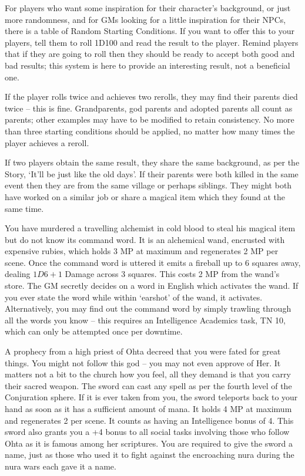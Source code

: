 \begin{multicols}{2}

For players who want some inspiration for their character's background, or just more randomness, and for GMs looking for a little inspiration for their NPCs, there is a table of Random Starting Conditions.  If you want to offer this to your players, tell them to roll 1D100 and read the result to the player.  Remind players that if they are going to roll then they should be ready to accept both good and bad results; this system is here to provide an interesting result, not a beneficial one.

If the player rolls twice and achieves two rerolls, they may find their parents died twice -- this is fine.  Grandparents, god parents and adopted parents all count as parents; other examples may have to be modified to retain consistency.  No more than three starting conditions should be applied, no matter how many times the player achieves a reroll.

	If two players obtain the same result, they share the same background, as per the Story, `It'll be just like the old days'.  If their parents were both killed in the same event then they are from the same village or perhaps siblings.  They might both have worked on a similar job or share a magical item which they found at the same time.

\setcounter{list}{0}
\begin{list}{\addtocounter{list}{1}\textbf{:}}{\raggedleft}

	\item{ You have murdered a travelling alchemist in cold blood to steal his magical item but do not know its command word.  It is an alchemical wand, encrusted with expensive rubies, which holds 3 MP at maximum and regenerates 2 MP per scene.  Once the command word is uttered it emits a fireball up to 6 squares away, dealing $1D6+1$ Damage across 3 squares.   This costs 2 MP from the wand's store.  The GM secretly decides on a word in English which activates the wand.  If you ever state the word while within `earshot' of the wand, it activates.  Alternatively, you may find out the command word by simply trawling through all the words you know -- this requires an Intelligence  Academics task, TN 10, which can only be attempted once per downtime. }

	\item{ A prophecy from a high priest of Ohta decreed that you were fated for great things.  You might not follow this god -- you may not even approve of Her.  It matters not a bit to the church how you feel, all they demand is that you carry their sacred weapon.  The sword can cast any spell as per the fourth level of the Conjuration sphere.  If it is ever taken from you, the sword teleports back to your hand as soon as it has a sufficient amount of mana.  It holds 4 MP at maximum and regenerates 2 per scene.  It counts as having an Intelligence bonus of 4.  This sword also grants you a +4 bonus to all social tasks involving those who follow Ohta as it is famous among her scriptures.  You are required to give the sword a name, just as those who used it to fight against the encroaching nura during the nura wars each gave it a name.}


\end{list}
\end{multicols}
